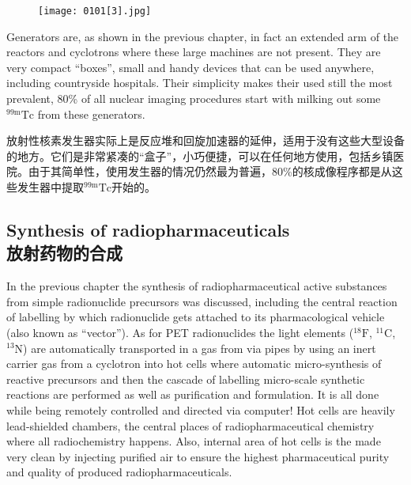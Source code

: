 \documentclass[dvipsnames, svgnames,a4paper,11pt]{article}
\begin{document}
\begin{figure}[h]
    \centering
    \texttt{[image: 0101[3].jpg]}
     \label{fig98}
\end{figure}

Generators are, as shown in the previous chapter, in fact an extended arm of the
reactors and cyclotrons where these large machines are not present. They are very
compact “boxes”, small and handy devices that can be used anywhere, including
countryside hospitals. Their simplicity makes their used still the most prevalent, 80\%
of all nuclear imaging procedures start with milking out some ${}^\mathrm{99m}\mathrm{Tc}$ from these
generators.

放射性核素发生器实际上是反应堆和回旋加速器的延伸，适用于没有这些大型设备的地方。它们是非常紧凑的“盒子”，小巧便捷，可以在任何地方使用，包括乡镇医院。由于其简单性，使用发生器的情况仍然最为普遍，80\%的核成像程序都是从这些发生器中提取${}^\mathrm{99m}\mathrm{Tc}$开始的。

\subsection{Synthesis of radiopharmaceuticals \\放射药物的合成}


In the previous chapter the synthesis of radiopharmaceutical active substances from
simple radionuclide precursors was discussed, including the central reaction of
labelling by which radionuclide gets attached to its pharmacological vehicle (also
known as “vector”). As for PET radionuclides the light elements (${}^{18}\mathrm{F}$, ${}^{11}\mathrm{C}$, ${}^{13}\mathrm{N}$) are
automatically transported in a gas from via pipes by using an inert carrier gas from a
cyclotron into hot cells where automatic micro-synthesis of reactive precursors and
then the cascade of labelling micro-scale synthetic reactions are performed as well
as purification and formulation. It is all done while being remotely controlled and
directed via computer! Hot cells are heavily lead-shielded chambers, the central
places of radiopharmaceutical chemistry where all radiochemistry happens. Also,
internal area of hot cells is the made very clean by injecting purified air to ensure the
highest pharmaceutical purity and quality of produced radiopharmaceuticals.
\end{document}
